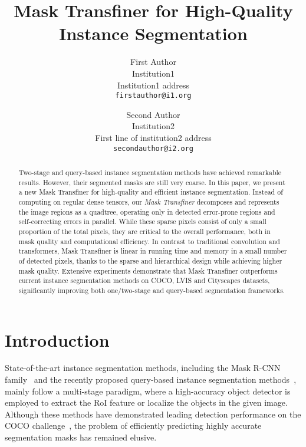 \documentclass[10pt,twocolumn,letterpaper]{article}
\begin{document}
\title{Mask Transfiner for High-Quality Instance Segmentation}

\author{First Author\\
Institution1\\
Institution1 address\\
{\tt\small firstauthor@i1.org}
\and
Second Author\\
Institution2\\
First line of institution2 address\\
{\tt\small secondauthor@i2.org}
}
\maketitle

\begin{abstract}
   Two-stage and query-based instance segmentation methods have achieved remarkable results. However, their segmented masks are still very coarse.
   In this paper, we present a new Mask Transfiner for high-quality and efficient instance segmentation. Instead of computing on regular dense tensors, our {\em Mask Transfiner} decomposes and represents the image regions as a quadtree, operating only in detected error-prone regions and self-correcting errors in parallel. While these sparse pixels consist of only a small proportion of the total pixels, they are critical  to the overall performance, both in mask quality and computational efficiency.  In contrast to traditional convolution and transformers, 
   Mask Transfiner is linear in running time and memory in a small number of detected pixels, thanks to the sparse and hierarchical design while achieving higher mask quality. 
   Extensive experiments demonstrate that Mask Transfiner outperforms current instance segmentation methods on COCO, LVIS and Cityscapes datasets, significantly improving 
   both one/two-stage and query-based segmentation frameworks.
\end{abstract}

\section{Introduction}
\label{sec:intro}


State-of-the-art instance segmentation methods, including the Mask R-CNN family~\cite{he2017mask,liu2018path,huang2019mask,ChengWHL20,ke2021bcnet} and the recently proposed query-based instance segmentation methods~\cite{dong2021solq,QueryInst,hu2021ISTR}, mainly follow a multi-stage paradigm, where a high-accuracy object detector is employed to extract the RoI feature or localize the objects in the given image. Although these methods have demonstrated leading detection performance on the COCO challenge~\cite{lin2014microsoft}, the problem of efficiently predicting highly accurate segmentation masks has remained elusive.
\end{document}
